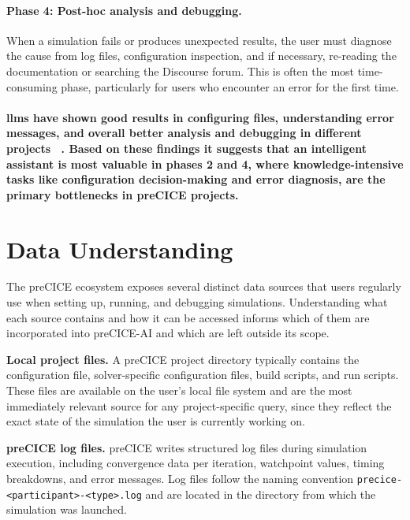 \documentclass[
  numbers=noenddot,
  english,
  a4paper,
  twoside,
  bibliography=totoc,
  headsepline,
  cleardoublepage=empty,
  parskip=half,
  draft=false
]{scrbook}
\theoremstyle{break}
\renewcommand{\_}{\textunderscore\allowbreak}
\begin{document}
\paragraph{Phase 4: Post-hoc analysis and debugging.}
When a simulation fails or produces unexpected results, the user must diagnose the cause from
log files, configuration inspection, and if necessary, re-reading the documentation or
searching the Discourse forum.
This is often the most time-consuming phase, particularly for users who encounter an error
for the first time.

\paragraph{\glspl{llm} have shown good results in configuring files, understanding error messages, and overall
better analysis and debugging in different projects ~\cite{hou2024largelanguagemodels}. 
Based on these findings it suggests that 
an intelligent assistant is most valuable in phases 2 and 4, where knowledge-intensive
tasks like configuration decision-making and error diagnosis, are the primary bottlenecks in preCICE projects.}


\section{Data Understanding}\label{sec:problem-exposition:data-understanding}

The preCICE ecosystem exposes several distinct data sources that users regularly use when
setting up, running, and debugging simulations. Understanding what each source contains and
how it can be accessed informs which of them are incorporated into preCICE-AI and which are
left outside its scope.

\noindent\textbf{Local project files.} A preCICE project directory typically contains the
configuration file, solver-specific configuration files, build scripts, and run scripts.
These files are available on the user's local file system and are the most immediately
relevant source for any project-specific query, since they reflect the exact state of the
simulation the user is currently working on.

\noindent\textbf{preCICE log files.} preCICE writes structured log files during simulation
execution, including convergence data per iteration, watchpoint values, timing breakdowns, and
error messages. Log files follow the naming convention
\texttt{precice-<participant>-<type>.log} and are located in the directory from which the
simulation was launched.
\end{document}
